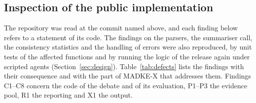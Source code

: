 \subsection{Inspection of the public implementation}
\label{sec:audit}
The repository was read at the commit named above, and each finding below refers to a statement of its code. The findings on the parsers, the summariser call, the consistency statistics and the handling of errors were also reproduced, by unit tests of the affected functions and by running the logic of the release again under scripted agents (Section~\ref{sec:design}). Table~\ref{tab:defects} lists the findings with their consequence and with the part of MADKE-X that addresses them. Findings C1--C8 concern the code of the debate and of its evaluation, P1--P3 the evidence pool, R1 the reporting and X1 the output.

